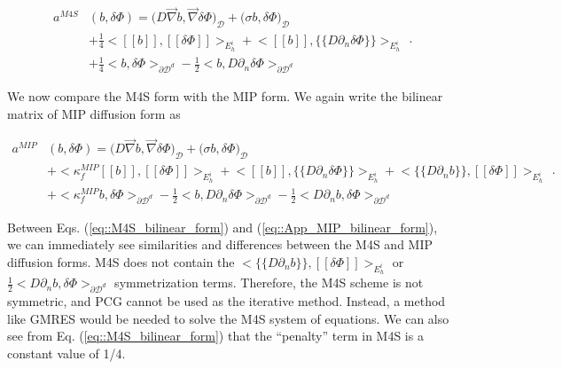 \begin{equation}
\label{eq::M4S_bilinear_form}
\begin{aligned}
a^{M4S}&(b, \delta \Phi)  = \Big(  D \vec{\nabla} b , \vec{\nabla} \delta \Phi  \Big)_{\mathcal{D}} + \Big(  \sigma b , \delta \Phi  \Big)_{\mathcal{D}}    \\
&+ \frac{1}{4}  \Big< [\![   b ]\!] , [\![  \delta \Phi ]\!]\Big>_{E_h^i} + \Big<  [\![  b ]\!] , \{\!\{  D \partial_n \delta \Phi \}\!\}\Big>_{E_h^i}   \\
&+ \frac{1}{4} \Big<   b , \delta  \Phi \Big>_{\partial \mathcal{D}^d} - \frac{1}{2} \Big<  b ,  D \partial_n \delta \Phi \Big>_{\partial \mathcal{D}^d} 
\end{aligned} .
\end{equation}

We now compare the M4S form with the MIP form. We again write the bilinear matrix of MIP diffusion form as

\begin{equation}
\label{eq::App_MIP_bilinear_form}
\begin{aligned}
a^{MIP}&(b, \delta \Phi)  = \Big(  D \vec{\nabla} b , \vec{\nabla} \delta \Phi  \Big)_{\mathcal{D}} + \Big(  \sigma b , \delta \Phi  \Big)_{\mathcal{D}}    \\
&+  \Big< \kappa_f^{MIP} [\![   b ]\!] , [\![  \delta \Phi ]\!]\Big>_{E_h^i} + \Big<  [\![  b ]\!] , \{\!\{  D \partial_n \delta \Phi \}\!\}\Big>_{E_h^i}  + \Big< \{\!\{  D \partial_n b \}\!\} , [\![ \delta \Phi ]\!]\Big>_{E_h^i} \\
&+ \Big< \kappa_f^{MIP}  b , \delta  \Phi \Big>_{\partial \mathcal{D}^d} - \frac{1}{2} \Big<  b ,  D \partial_n \delta \Phi \Big>_{\partial \mathcal{D}^d} - \frac{1}{2} \Big<   D \partial_n b , \delta \Phi \Big>_{\partial \mathcal{D}^d}  
\end{aligned} .
\end{equation}

\noindent Between Eqs. (\ref{eq::M4S_bilinear_form}) and (\ref{eq::App_MIP_bilinear_form}), we can immediately see similarities and differences between the M4S and MIP diffusion forms. M4S does not contain the $\Big< \{\!\{  D \partial_n b \}\!\} , [\![ \delta \Phi ]\!]\Big>_{E_h^i}$ or $\frac{1}{2} \Big<   D \partial_n b , \delta \Phi \Big>_{\partial \mathcal{D}^d}  $ symmetrization terms. Therefore, the M4S scheme is not symmetric, and PCG cannot be used as the iterative method. Instead, a method like GMRES would be needed to solve the M4S system of equations. We can also see from Eq. (\ref{eq::M4S_bilinear_form}) that the ``penalty'' term in M4S is a constant value of 1/4.


